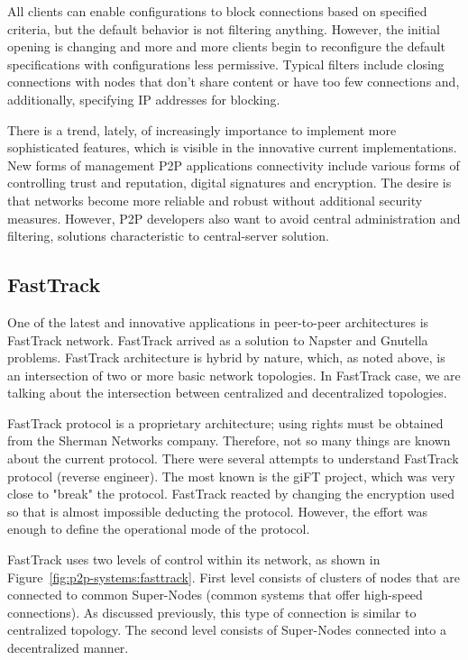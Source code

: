 All clients can enable configurations to block connections based on specified
criteria, but the default behavior is not filtering anything. However, the
initial opening is changing and more and more clients begin to reconfigure the
default specifications with configurations less permissive. Typical filters
include closing connections with nodes that don't share content or have too few
connections and, additionally, specifying IP addresses for blocking.

There is a trend, lately, of increasingly importance to implement more
sophisticated features, which is visible in the innovative current
implementations. New forms of management P2P applications connectivity include
various forms of controlling trust and reputation, digital signatures and
encryption. The desire is that networks become more reliable and robust without
additional security measures. However, P2P developers also want to avoid central
administration and filtering, solutions characteristic to central-server
solution.

\subsection{FastTrack}

One of the latest and innovative  applications in peer-to-peer architectures
is FastTrack network. FastTrack arrived as a solution to Napster and Gnutella
problems. FastTrack architecture is hybrid by nature, which, as noted above, is
an intersection of two or more basic network topologies.  In FastTrack case,
we are talking about the intersection between centralized and decentralized
topologies.

FastTrack protocol is a proprietary architecture; using rights must be obtained
from the Sherman Networks company. Therefore, not so many things are known about
the current protocol. There were several attempts to understand FastTrack
protocol (reverse engineer). The most known is the giFT project, which was very
close to "break" the protocol. FastTrack reacted by changing the encryption
used so that is almost impossible deducting the protocol. However, the effort
was enough to define the operational mode of the protocol.

FastTrack uses two levels of control within its network, as shown in
Figure~\ref{fig:p2p-systems:fasttrack}. First level consists of clusters of
nodes that are connected to common Super-Nodes (common systems that offer
high-speed connections). As discussed previously, this type of connection is
similar to centralized topology. The second level consists of Super-Nodes
connected into a decentralized manner.

